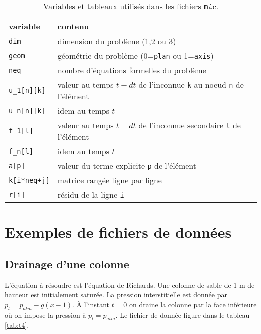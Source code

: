 \documentclass[a4paper,11pt]{article}
\begin{document}
\begin{table}[ht]
\begin{center}
\begin{tabular}{|l|l|}
\hline
variable & contenu\\ \hline\hline
{\tt dim} & dimension du probl\`eme (1,2 ou 3)\\ \hline
{\tt geom} & g\'eom\'etrie du probl\`eme (0={\tt plan} ou 1={\tt axis})\\ \hline
{\tt neq} & nombre d'\'equations formelles du probl\`eme\\ \hline
{\tt u\_1[n][k]} & valeur au temps $t+dt$ de l'inconnue {\tt k} au noeud {\tt n} de l'\'el\'ement\\ \hline
{\tt u\_n[n][k]} & idem au temps $t$\\ \hline
{\tt f\_1[l]} & valeur au temps $t+dt$ de l'inconnue secondaire {\tt l} de l'\'el\'ement\\ \hline
{\tt f\_n[l]} & idem au temps $t$\\ \hline
{\tt a[p]} & valeur du terme explicite {\tt p} de l'\'el\'ement\\ \hline
{\tt k[i*neq+j]} & matrice rang\'ee ligne par ligne\\ \hline
{\tt r[i]} & r\'esidu de la ligne {\tt i}\\ \hline
\end{tabular}
\end{center}
\caption{Variables et tableaux utilis\'es dans les fichiers {\tt m}\textit{i}.c.}
\label{tab:t3}
\end{table}

\section{Exemples de fichiers de donn\'ees}
\subsection{Drainage d'une colonne}
L'\'equation \`a r\'esoudre est l'\'equation de Richards. Une colonne de sable de 1 m de hauteur est initialement satur\'ee. La pression interstitielle est donn\'ee par $p_l = p_{atm} - g(x - 1)$. \`A l'instant $t=0$ on draine la colonne par la face inf\'erieure o\`u on impose la pression \`a $p_l=p_{atm}$. Le fichier de donn\'ee figure dans le tableau \ref{tab:t4}.
\end{document}
